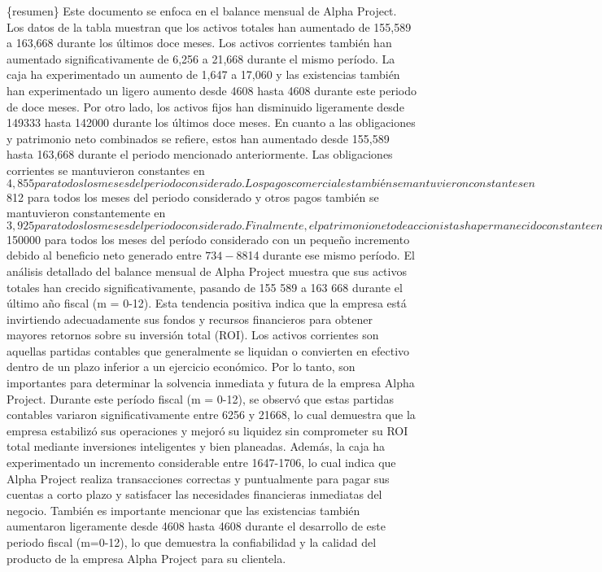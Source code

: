 \{resumen\} Este documento se enfoca en el balance mensual de Alpha Project. Los datos de la tabla muestran que los activos totales han aumentado de 155,589 a 163,668 durante los últimos doce meses. Los activos corrientes también han aumentado significativamente de 6,256 a 21,668 durante el mismo período. La caja ha experimentado un aumento de 1,647 a 17,060 y las existencias también han experimentado un ligero aumento desde 4608 hasta 4608 durante este periodo de doce meses. Por otro lado, los activos fijos han disminuido ligeramente desde 149333 hasta 142000 durante los últimos doce meses. En cuanto a las obligaciones y patrimonio neto combinados se refiere, estos han aumentado desde 155,589 hasta 163,668 durante el periodo mencionado anteriormente. Las obligaciones corrientes se mantuvieron constantes en $4,855 para todos los meses del periodo considerado. Los pagos comerciales también se mantuvieron constantes en $812 para todos los meses del periodo considerado y otros pagos también se mantuvieron constantemente en $3,925 para todos los meses del periodo considerado. Finalmente, el patrimonio neto de accionistas ha permanecido constante en $150000 para todos los meses del período considerado con un pequeño incremento debido al beneficio neto generado entre $734 - $8814 durante ese mismo período.
El análisis detallado del balance mensual de Alpha Project muestra que sus activos totales han crecido significativamente, pasando de 155 589 a 163 668 durante el último año fiscal (m = 0-12). Esta tendencia positiva indica que la empresa está invirtiendo adecuadamente sus fondos y recursos financieros para obtener mayores retornos sobre su inversión total (ROI).
Los activos corrientes son aquellas partidas contables que generalmente se liquidan o convierten en efectivo dentro de un plazo inferior a un ejercicio económico. Por lo tanto, son importantes para determinar la solvencia inmediata y futura de la empresa Alpha Project. Durante este período fiscal (m = 0-12), se observó que estas partidas contables variaron significativamente entre 6256 y 21668, lo cual demuestra que la empresa estabilizó sus operaciones y mejoró su liquidez sin comprometer su ROI total mediante inversiones inteligentes y bien planeadas.
Además, la caja ha experimentado un incremento considerable entre 1647-1706, lo cual indica que Alpha Project realiza transacciones correctas y puntualmente para pagar sus cuentas a corto plazo y satisfacer las necesidades financieras inmediatas del negocio. También es importante mencionar que las existencias también aumentaron ligeramente desde 4608 hasta 4608 durante el desarrollo de este periodo fiscal (m=0-12), lo que demuestra la confiabilidad y la calidad del producto de la empresa Alpha Project para su clientela.
